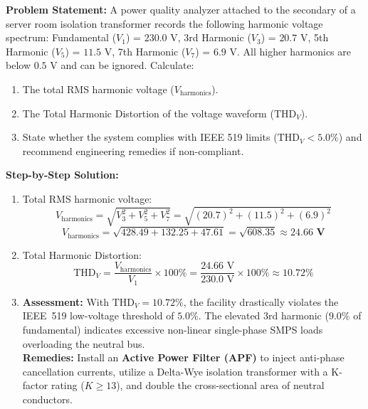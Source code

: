 \begin{tcolorbox}[colback=white,colframe=navyblue,title=\textbf{Problem 11: Total Harmonic Distortion (THD) and IEEE 519 Assessment}]
\textbf{Problem Statement:} A power quality analyzer attached to the secondary of a server room isolation transformer records the following harmonic voltage spectrum:
Fundamental ($V_1$) = $230.0\text{ V}$, 3rd Harmonic ($V_3$) = $20.7\text{ V}$, 5th Harmonic ($V_5$) = $11.5\text{ V}$, 7th Harmonic ($V_7$) = $6.9\text{ V}$. All higher harmonics are below $0.5\text{ V}$ and can be ignored. Calculate:
\begin{enumerate}[label=(\alph*),leftmargin=*]
    \item The total RMS harmonic voltage ($V_{\text{harmonics}}$).
    \item The Total Harmonic Distortion of the voltage waveform ($\text{THD}_V$).
    \item State whether the system complies with IEEE 519 limits ($\text{THD}_V < 5.0\%$) and recommend engineering remedies if non-compliant.
\end{enumerate}
\textbf{Step-by-Step Solution:}
\begin{enumerate}[label=(\alph*),leftmargin=*]
    \item Total RMS harmonic voltage:
    \[
    V_{\text{harmonics}} = \sqrt{V_3^2 + V_5^2 + V_7^2} = \sqrt{(20.7)^2 + (11.5)^2 + (6.9)^2}
    \]
    \[
    V_{\text{harmonics}} = \sqrt{428.49 + 132.25 + 47.61} = \sqrt{608.35} \approx \mathbf{24.66\text{ V}}
    \]
    \item Total Harmonic Distortion:
    \[
    \text{THD}_V = \frac{V_{\text{harmonics}}}{V_1} \times 100\% = \frac{24.66\text{ V}}{230.0\text{ V}} \times 100\% \approx \mathbf{10.72\%}
    \]
    \item \textbf{Assessment:} With $\text{THD}_V = 10.72\%$, the facility drastically violates the IEEE~519 low-voltage threshold of $5.0\%$. The elevated 3rd harmonic ($9.0\%$ of fundamental) indicates excessive non-linear single-phase SMPS loads overloading the neutral bus. \\
    \textbf{Remedies:} Install an \textbf{Active Power Filter (APF)} to inject anti-phase cancellation currents, utilize a Delta-Wye isolation transformer with a K-factor rating ($K \ge 13$), and double the cross-sectional area of neutral conductors.
\end{enumerate}
\end{tcolorbox}

